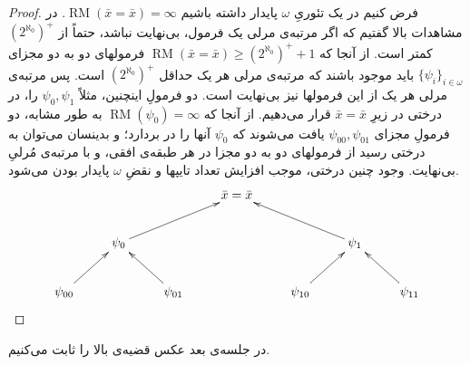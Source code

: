 \documentclass[12pt,a4paper]{report}
\theoremstyle{colorhead}
\DeclareMathOperator{\RM}{RM}
\begin{document}
\begin{proof}
فرض کنیم در یک تئوریِ
$\omega$
پایدار داشته باشیم
$\RM(\bar{x}=\bar{x})=\infty$.
در مشاهدات بالا گفتیم که اگر مرتبه‌ی مرلی یک فرمول، بی‌نهایت نباشد، حتماً
از
$(2^{\aleph_0})^+$
کمتر است. از آنجا که 
$\RM(\bar{x}=\bar{x})\geq (2^{\aleph_0})^+ +1$
فرمولهای
دو به دو مجزای
$\{\psi_i\}_{i\in \omega}$
باید موجود باشند که مرتبه‌ی مرلی هر یک حداقل
$(2^{\aleph_0})^+$
است. 
پس مرتبه‌ی مرلی هر یک از این فرمولها نیز بی‌نهایت است. دو فرمولِ اینچنین، مثلاً
$\psi_{0},\psi_1$
را، در درختی در زیرِ
$\bar{x}=\bar{x}$
قرار می‌دهیم. از آنجا که 
$\RM(\psi_0)=\infty$
به طور مشابه، دو فرمولِ مجزای
$\psi_{00},\psi_{01}$
یافت می‌شوند که 
$\psi_0$
آنها را در بردارد؛ و بدینسان می‌توان به درختی رسید از فرمولهای دو به دو مجزا در هر طبقه‌ی افقی، و  با مرتبه‌ی مُرلیِ بی‌نهایت. وجود چنین درختی،
موجب افزایش تعداد تایپها و نقضِ
$\omega$
پایدار بودن می‌شود.
\[
\xymatrix{
& & & \bar{x}=\bar{x}\\
& \psi_0\ar[urr] & & & & \psi_1\ar[ull]\\
\psi_{00}\ar[ur]& & \psi_{01}\ar[ul]& & \psi_{10}\ar[ur] & &\psi_{11}\ar[ul]
}
\]
\end{proof}
در جلسه‌ی بعد عکس قضیه‌ی بالا را  ثابت می‌کنیم.
\pagebreak
\end{document}
